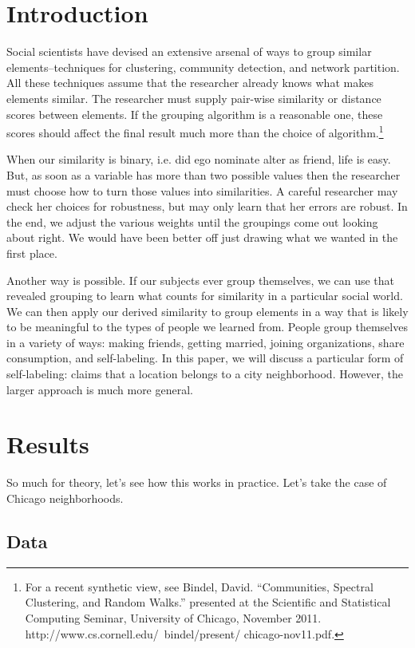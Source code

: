 \documentclass[12pt,letter]{article}\usepackage[]{graphicx}\usepackage[]{color}
\begin{document}
\section*{Introduction}
Social scientists have devised an extensive arsenal of ways to group
similar elements--techniques for clustering, community detection, and
network partition. All these techniques assume that the researcher
already knows what makes elements similar. The researcher must supply
pair-wise similarity or distance scores between elements. If the
grouping algorithm is a reasonable one, these scores should affect the
final result much more than the choice of algorithm.\footnote{For a
  recent synthetic view, see Bindel, David. “Communities, Spectral
  Clustering, and Random Walks.” presented at the Scientific and
  Statistical Computing Seminar, University of Chicago, November
  2011. http://www.cs.cornell.edu/~bindel/present/ chicago-nov11.pdf.}

When our similarity is binary, i.e. did ego nominate alter as friend, life is
easy. But, as soon as a variable has more than two possible values then the
researcher must choose how to turn those values into similarities. A careful
researcher may check her choices for robustness, but may only learn that
her errors are robust. In the end, we adjust the various weights until the
groupings come out looking about right. We would have been better off just
drawing what we wanted in the first place.

Another way is possible. If our subjects ever group themselves, we can
use that revealed grouping to learn what counts for similarity in a particular
social world. We can then apply our derived similarity to group elements in
a way that is likely to be meaningful to the types of people we learned from.
People group themselves in a variety of ways: making friends, getting
married, joining organizations, share consumption, and self-labeling. In this
paper, we will discuss a particular form of self-labeling: claims that a location
belongs to a city neighborhood. However, the larger approach is much more
general.



\section*{Results}
So much for theory, let's see how this works in practice. Let's take
the case of Chicago neighborhoods.  

\subsection*{Data}
\end{document}

